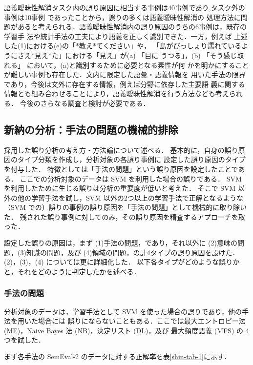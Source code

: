 \documentclass[japanese]{jnlp_1.4}
\begin{document}
語義曖昧性解消タスク内の誤り原因に相当する事例は40事例であり,タスク外の事例は10事例
であったことから，誤りの多くは語義曖昧性解消の
処理方法に問題があると考えられる．語義曖昧性解消内の誤り原因のうちの6事例は，既存の学習手
法や統計手法の工夫により語義を正しく識別できた．一方，例えば
上述した(1)における(e)の「*教え*てください」や，
「島がびっしょり濡れているようにさえ*見え*た」における「見え」が(a) 「目に
うつる」，(b) 「そう感じ取れる」 において，(a)と識別するために必要となる素性が何
かを明かにすることが難しい事例も存在した．文内に限定した語彙・語義情報を
用いた手法の限界であり，今後は文外に存在する情報，例えば分野に依存した主要語
義に関する情報とも組み合わせることにより，語義曖昧性解消を行う方法なども考えられる．
今後のさらなる調査と検討が必要である．


\subsection{新納の分析：手法の問題の機械的排除}
\label{sec:shinnou}

採用した誤り分析の考え方・方法論について述べる．
基本的に，自身の誤り原因のタイプ分類を作成し，分析対象の各誤り事例に
設定した誤り原因のタイプを付与した．
特徴としては「手法の問題」という誤り原因を設定したことである．
ここでの分析対象のデータは SVM を利用した場合の誤りである．
SVM を利用したために生じる誤りは分析の重要度が低いと考えた．
そこで SVM 以外の他の学習手法を試し，SVM 以外の2つ以上の学習手法で正解となるような
（SVM での）誤りの事例の誤り原因を「手法の問題」として機械的に取り除いた．
残された誤り事例に対してのみ，その誤り原因を精査するアプローチを取った．

設定した誤りの原因は，まず (1)手法の問題，であり，それ以外に
(2)意味の問題，(3)知識の問題，及び (4)領域の問題，の計4タイプの誤り原因を設けた．
(2)，(3)，(4) については更に詳細化した．
以下各タイプがどのような誤りかと，それをどのように判定したかを述べる．


\subsubsection{手法の問題}

分析対象のデータは，学習手法として SVM を使った場合の誤りであり，他の手法を用いた場合には
誤りにならないこともある．ここでは最大エントロピー法 (ME)，Naive Bayes 法 (NB)，決定リスト (DL)，及び
最大頻度語義 (MFS) の 4 つを試した．

まず各手法の SemEval-2 のデータに対する正解率を\mbox{表\ref{shin-tab-1}}に示す．
\end{document}
